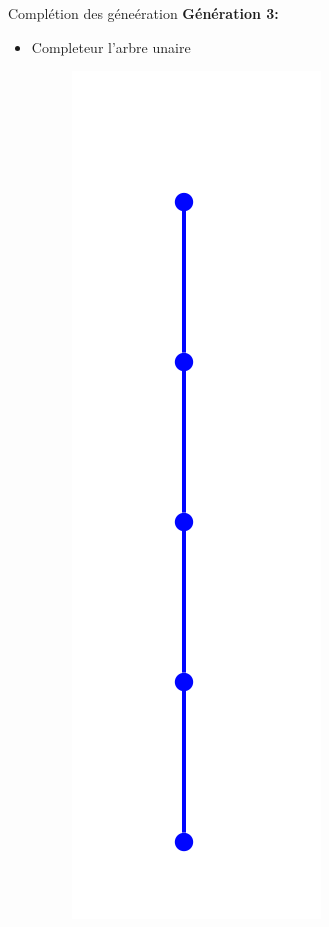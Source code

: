 \documentclass{beamer}
\begin{document}
\begin{frame}{Complétion des géneération}
\textbf{Génération 3:}\\
\begin{itemize}
\item  Completeur l'arbre unaire
\begin{figure}[h]
  \centering
  \includegraphics[scale=0.17]{gen3-1.png}
\end{figure}
\end{itemize}
\end{frame}
\end{document}
